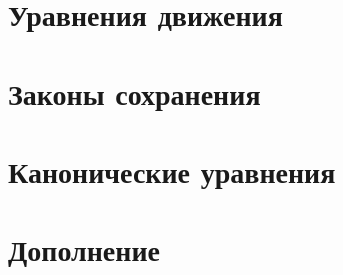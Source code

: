 



\section{Уравнения движения}
\setcounter{subsection}{1}


\section{Законы сохранения}
\setcounter{subsection}{5}

\setcounter{section}{6}
\section{Канонические уравнения}
\setcounter{subsection}{39}




\newpage
\section{Дополнение}

